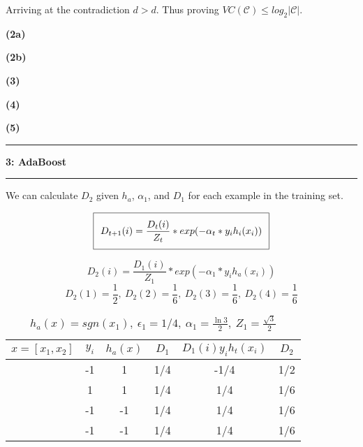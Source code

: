 \documentclass[11pt]{article}
\newcommand\question[2]{\vspace{.25in}\hrule\textbf{#1: #2}\vspace{.5em}\hrule\vspace{.10in}}
\renewcommand\part[1]{\vspace{.10in}\textbf{(#1)}}
\begin{document}
Arriving at the contradiction $d > d$. Thus proving $VC(\mathcal{C}) \leq log_2|\mathcal{C}|$.

\part{2a}

\part{2b}

\part{3}

\part{4}

\part{5}

\question{3}{AdaBoost}
We can calculate $D_2$ given $h_a$, $\alpha_1$, and $D_1$ for each example in the training set.

\begin{equation}
\setlength\fboxsep{0.25cm}
\setlength\fboxrule{0.4pt}
\boxed{D_{t+1}(i) = \frac{D_t(i)}{Z_t} * exp(-\alpha_t * y_ih_i(x_i))}
\end{equation}

$$D_{2}(i) = \frac{D_1(i)}{Z_1} * exp(-\alpha_1 * y_ih_a(x_i))$$
$$D_2(1) = \frac{1}{2}, \ D_2(2) = \frac{1}{6}, \ D_2(3) = \frac{1}{6}, \ D_2(4) = \frac{1}{6} $$


 \begin{table}[H]
\centering
{\renewcommand{\arraystretch}{1.2}%
\begin{tabular}{| c | c | c | c | c | c |}
\hline
$x = [x_1, x_2]$& $y_i$ & $h_a(x)$ & $D_1$ & $D_1(i)y_ih_t(x_i)$ & $D_2$\\
\hline
[1,1] & -1 & 1 & 1/4 & -1/4 & 1/2\\ \hline
[1,-1] & 1 & 1 & 1/4 & 1/4 & 1/6\\ \hline
[-1,-1] & -1 & -1 & 1/4 & 1/4 & 1/6\\ \hline
[-1,1] & -1 & -1 & 1/4 & 1/4 & 1/6\\ \hline
\end{tabular}}
\caption{$h_a(x) = sgn(x_1), \ \epsilon_1 = 1/4, \ \alpha_1 = \frac{\ln3}{2}, \ Z_1 = \frac{\sqrt{3}}{2}$}
\end{table}
\end{document}

